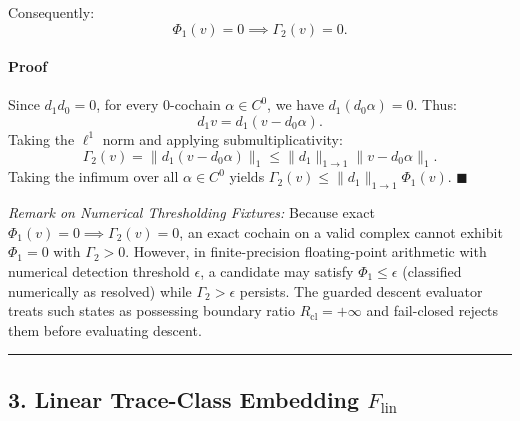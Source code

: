 \documentclass[
  10pt,
]{article}
\begin{document}
Consequently: \protect\hypertarget{math-E0024-0021}{}{\[\boxed{\Phi_1(v) = 0 \implies \Gamma_2(v) = 0.}\]}

\paragraph{Proof}\label{proof}

Since \protect\hypertarget{math-E0017-0022}{}{\(d_1 d_0 = 0\)}, for every 0-cochain \protect\hypertarget{math-E0025-0023}{}{\(\alpha \in C^0\)}, we have \protect\hypertarget{math-E0026-0024}{}{\(d_1(d_0 \alpha) = 0\)}. Thus: \protect\hypertarget{math-E0027-0025}{}{\[d_1 v = d_1(v - d_0 \alpha).\]} Taking the \protect\hypertarget{math-E0001-0026}{}{\(\ell^1\)} norm and applying submultiplicativity: \protect\hypertarget{math-E0028-0027}{}{\[\Gamma_2(v) = \|d_1(v - d_0 \alpha)\|_1 \le \|d_1\|_{1\to 1} \|v - d_0 \alpha\|_1.\]} Taking the infimum over all \protect\hypertarget{math-E0025-0028}{}{\(\alpha \in C^0\)} yields \protect\hypertarget{math-E0029-0029}{}{\(\Gamma_2(v) \le \|d_1\|_{1\to 1} \Phi_1(v)\)}. \protect\hypertarget{math-E0030-0030}{}{\(\blacksquare\)}

\emph{Remark on Numerical Thresholding Fixtures:} Because exact \protect\hypertarget{math-E0031-0031}{}{\(\Phi_1(v) = 0 \implies \Gamma_2(v) = 0\)}, an exact cochain on a valid complex cannot exhibit \protect\hypertarget{math-E0032-0032}{}{\(\Phi_1 = 0\)} with \protect\hypertarget{math-E0033-0033}{}{\(\Gamma_2 > 0\)}. However, in finite-precision floating-point arithmetic with numerical detection threshold \protect\hypertarget{math-E0034-0034}{}{\(\epsilon\)}, a candidate may satisfy \protect\hypertarget{math-E0035-0035}{}{\(\Phi_1 \le \epsilon\)} (classified numerically as resolved) while \protect\hypertarget{math-E0036-0036}{}{\(\Gamma_2 > \epsilon\)} persists. The guarded descent evaluator treats such states as possessing boundary ratio \protect\hypertarget{math-E0037-0037}{}{\(R_{\mathrm{cl}} = +\infty\)} and fail-closed rejects them before evaluating descent.

\begin{center}\rule{0.5\linewidth}{0.5pt}\end{center}

\subsection[3. Linear Trace-Class Embedding ]{\texorpdfstring{3. Linear Trace-Class Embedding \protect\hypertarget{math-E0004-0038}{}{\(F_{\mathrm{lin}}\)}}{3. Linear Trace-Class Embedding F\_\{\textbackslash mathrm\{lin\}\}}}\label{linear-trace-class-embedding-f_mathrmlin}
\end{document}
